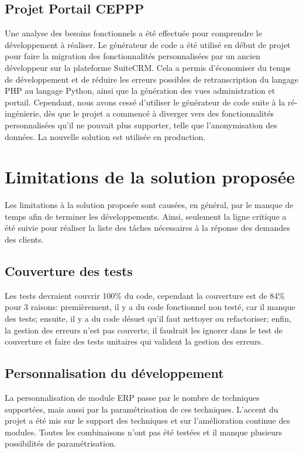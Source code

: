 \subsection{Projet Portail CEPPP}

Une analyse des besoins fonctionnels a été effectuée pour comprendre le développement à réaliser. Le générateur de code a été utilisé en début de projet pour faire la migration des fonctionnalités personnalisées par un ancien développeur sur la plateforme SuiteCRM. Cela a permis d'économiser du temps de développement et de réduire les erreurs possibles de retranscription du langage PHP au langage Python, ainsi que la génération des vues administration et portail. Cependant, nous avons cessé d'utiliser le générateur de code suite à la ré-ingénierie, dès que le projet a commencé à diverger vers des fonctionnalités personnalisées qu’il ne pouvait plus supporter, telle que l'anonymisation des données. La nouvelle solution est utilisée en production.

\section{Limitations de la solution proposée}\label{sec:Limitations}

Les limitations à la solution proposée sont causées, en général, par le manque de temps afin de terminer les développements. Ainsi, seulement la ligne critique a été suivie pour réaliser la liste des tâches nécessaires à la réponse des demandes des clients.

\subsection{Couverture des tests}
Les tests devraient couvrir 100\% du code, cependant la couverture est de 84\% pour 3 raisons: premièrement, il y a du code fonctionnel non testé, car il manque des tests; ensuite, il y a du code désuet qu’il faut nettoyer ou refactoriser; enfin, la gestion des erreurs n’est pas couverte, il faudrait les ignorer dans le test de couverture et faire des tests unitaires qui valident la gestion des erreurs.

\subsection{Personnalisation du développement}
La personnalisation de module ERP passe par le nombre de techniques supportées, mais aussi par la paramétrisation de ces techniques. L'accent du projet a été mis sur le support des techniques et sur l'amélioration continue des modules. Toutes les combinaisons n'ont pas été testées et il manque plusieurs possibilités de paramétrisation.

